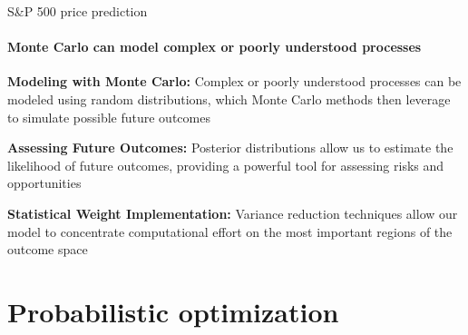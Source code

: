 \documentclass{beamer}
\begin{document}
\begin{frame}{S\&P 500 price prediction}
  \framesubtitle{Monte Carlo can model complex or poorly understood processes}

  \textbf{Modeling with Monte Carlo:} Complex or poorly understood processes
  can be modeled using random distributions, which Monte Carlo methods then
  leverage to simulate possible future outcomes

  \vspace{0.5cm}

  \textbf{Assessing Future Outcomes:} Posterior distributions allow us to
  estimate the likelihood of future outcomes, providing a powerful tool
  for assessing risks and opportunities

  \vspace{0.5cm}

  \textbf{Statistical Weight Implementation:} Variance reduction techniques
  allow our model to concentrate computational effort on the most important
  regions of the outcome space

  \vspace{0.5cm}
\end{frame}

\section{Probabilistic optimization}
\end{document}

